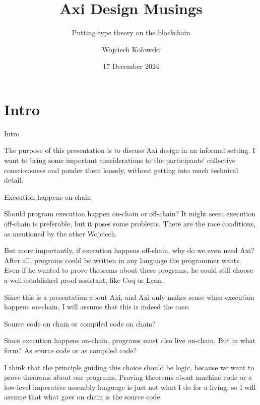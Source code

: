 \documentclass{beamer}
\title{Axi Design Musings}
\subtitle{Putting type theory on the blockchain}
\author{Wojciech Kołowski}
\date{17 December 2024}
\begin{document}
\frame{\titlepage}

\section{Intro}

\begin{frame}{Intro}

The purpose of this presentation is to discuss Axi design in an informal setting. I want to bring some important considerations to the participants' collective consciousness and ponder them loosely, without getting into much technical detail.

\end{frame}

\begin{frame}{Execution happens on-chain}

Should program execution happen on-chain or off-chain? It might seem execution off-chain is preferable, but it poses some problems. There are the race conditions, as mentioned by the other Wojciech.

\vspace{2em}

But more importantly, if execution happens off-chain, why do we even need Axi? After all, programs could be written in any language the programmer wants. Even if he wanted to prove theorems about these programs, he could still choose a well-established proof assistant, like Coq or Lean.

\vspace{2em}

Since this is a presentation about Axi, and Axi only makes sense when execution happens on-chain, I will assume that this is indeed the case.

\end{frame}

\begin{frame}{Source code on chain or compiled code on chain?}

Since execution happens on-chain, programs must also live on-chain. But in what form? As source code or as compiled code?

\vspace{1em}

I think that the principle guiding this choice should be logic, because we want to prove theorems about our programs. Proving theorems about machine code or a low-level imperative assembly language is just not what I do for a living, so I will assume that what goes on chain is the source code.

\end{frame}
\end{document}
